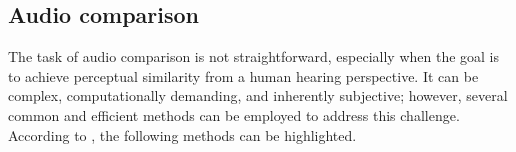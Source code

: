 \documentclass[sigconf,natbib=false]{acmart}
\begin{document}






\subsection{Audio comparison}

The task of audio comparison is not straightforward, especially when the goal is to achieve perceptual similarity from a human hearing perspective. It can be complex, computationally demanding, and inherently subjective; however, several common and efficient methods can be employed to address this challenge. According to \textcite{claesson2021resynthesis}, the following methods can be highlighted.

\end{document}
